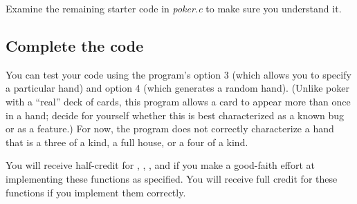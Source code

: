 Examine the remaining starter code in \textit{poker.c} to make sure you understand it.

\subsection{Complete the code} \label{subsec:completepoker}

\begin{description}
\end{description}

You can test your code using the program's option 3 (which allows you to specify a particular hand) and option 4 (which generates a random hand).
(Unlike poker with a ``real'' deck of cards, this program allows a card to appear more than once in a hand;
decide for yourself whether this is best characterized as a known bug or as a feature.)
For now, the program does not correctly characterize a hand that is a three of a kind, a full house, or a four of a kind.

\begin{description}
\end{description}

You will receive half-credit for , , , and  if you make a good-faith effort at implementing these functions as specified.
You will receive full credit for these functions if you implement them correctly.
